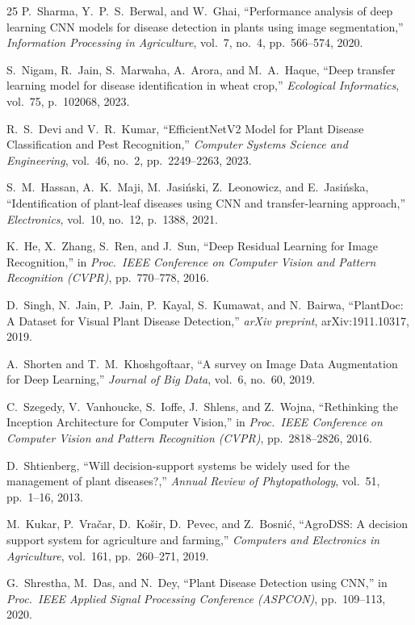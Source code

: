 \documentclass[12pt,a4paper]{report}
\begin{document}
\begin{thebibliography}{25}
P.~Sharma, Y.~P.~S.~Berwal, and W.~Ghai,
``Performance analysis of deep learning CNN models for disease detection in plants using image segmentation,''
\textit{Information Processing in Agriculture}, vol.~7, no.~4, pp.~566--574, 2020.

S.~Nigam, R.~Jain, S.~Marwaha, A.~Arora, and M.~A.~Haque,
``Deep transfer learning model for disease identification in wheat crop,''
\textit{Ecological Informatics}, vol.~75, p.~102068, 2023.

R.~S.~Devi and V.~R.~Kumar,
``EfficientNetV2 Model for Plant Disease Classification and Pest Recognition,''
\textit{Computer Systems Science and Engineering}, vol.~46, no.~2, pp.~2249--2263, 2023.

S.~M.~Hassan, A.~K.~Maji, M.~Jasi\'{n}ski, Z.~Leonowicz, and E.~Jasi\'{n}ska,
``Identification of plant-leaf diseases using CNN and transfer-learning approach,''
\textit{Electronics}, vol.~10, no.~12, p.~1388, 2021.

K.~He, X.~Zhang, S.~Ren, and J.~Sun,
``Deep Residual Learning for Image Recognition,''
in \textit{Proc.\ IEEE Conference on Computer Vision and Pattern Recognition (CVPR)}, pp.~770--778, 2016.

D.~Singh, N.~Jain, P.~Jain, P.~Kayal, S.~Kumawat, and N.~Bairwa,
``PlantDoc: A Dataset for Visual Plant Disease Detection,''
\textit{arXiv preprint}, arXiv:1911.10317, 2019.

A.~Shorten and T.~M.~Khoshgoftaar,
``A survey on Image Data Augmentation for Deep Learning,''
\textit{Journal of Big Data}, vol.~6, no.~60, 2019.

C.~Szegedy, V.~Vanhoucke, S.~Ioffe, J.~Shlens, and Z.~Wojna,
``Rethinking the Inception Architecture for Computer Vision,''
in \textit{Proc.\ IEEE Conference on Computer Vision and Pattern Recognition (CVPR)}, pp.~2818--2826, 2016.

D.~Shtienberg,
``Will decision-support systems be widely used for the management of plant diseases?,''
\textit{Annual Review of Phytopathology}, vol.~51, pp.~1--16, 2013.

M.~Kukar, P.~Vra\v{c}ar, D.~Ko\v{s}ir, D.~Pevec, and Z.~Bosni\'{c},
``AgroDSS: A decision support system for agriculture and farming,''
\textit{Computers and Electronics in Agriculture}, vol.~161, pp.~260--271, 2019.

G.~Shrestha, M.~Das, and N.~Dey,
``Plant Disease Detection using CNN,''
in \textit{Proc.\ IEEE Applied Signal Processing Conference (ASPCON)}, pp.~109--113, 2020.


\end{thebibliography}
\end{document}
